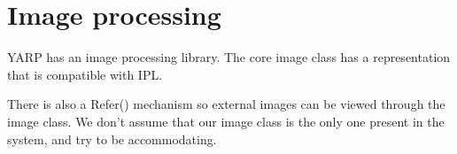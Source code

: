 
\section{Image processing}

YARP has an image processing library.  
The core image class has a representation that is compatible
with IPL.

There is also a Refer() mechanism so external images
can be viewed through the image class.  We don't assume
that our image class is the only one present in the
system, and try to be accommodating.